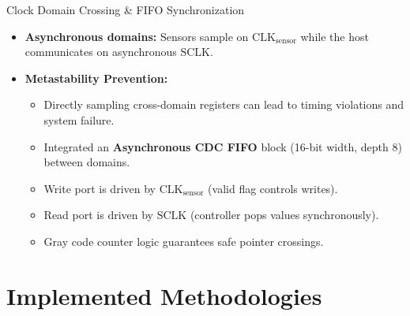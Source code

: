 \documentclass{beamer}
\begin{document}
\begin{frame}{Clock Domain Crossing \& FIFO Synchronization}
  \begin{itemize}
    \item \textbf{Asynchronous domains:} Sensors sample on $\text{CLK}_{\text{sensor}}$ while the host communicates on asynchronous $\text{SCLK}$.
    \item \textbf{Metastability Prevention:} 
    \begin{itemize}
      \item Directly sampling cross-domain registers can lead to timing violations and system failure.
      \item Integrated an \textbf{Asynchronous CDC FIFO} block (16-bit width, depth 8) between domains.
      \item Write port is driven by $\text{CLK}_{\text{sensor}}$ (valid flag controls writes).
      \item Read port is driven by $\text{SCLK}$ (controller pops values synchronously).
      \item Gray code counter logic guarantees safe pointer crossings.
    \end{itemize}
  \end{itemize}
\end{frame}

\section{Implemented Methodologies}
\end{document}
